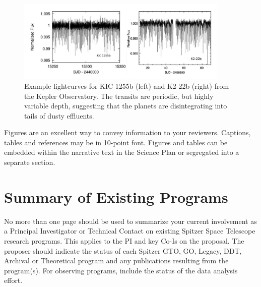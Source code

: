 \documentclass[letterpaper,12pt]{article}
\begin{document}
\begin{figure}
\centering
\includegraphics[width=0.9\textwidth]{kepler_lightc_variable.png}
\caption{Example lightcurves for KIC 1255b (left) and K2-22b (right) from the Kepler Observatory. The transits are periodic, but highly variable depth, suggesting that the planets are disintegrating into tails of dusty effluents.}\label{fig:exKeplerCurves}
\end{figure}

Figures are an excellent way to convey information to your reviewers.
Captions, tables and references may be in 10-point font.  Figures and tables 
can be embedded within the narrative text in the Science Plan or 
segregated into a separate section. \newline





\section{Summary of Existing Programs}

No more than one page should be used to summarize your current
involvement as a Principal Investigator or Technical Contact on existing 
Spitzer Space Telescope research programs. This applies to the PI and 
key Co-Is on the proposal. The proposer should indicate the status of 
each Spitzer GTO, GO, Legacy, DDT, Archival or Theoretical program and 
any publications resulting from the program(s). For observing programs, 
include the status of the data analysis effort.
\end{document}
